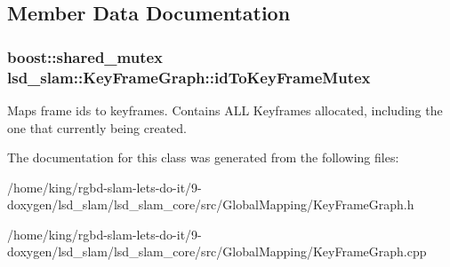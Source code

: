 \subsection{Member Data Documentation}
\hypertarget{classlsd__slam_1_1_key_frame_graph_aec658110a47437fdf2aa9c2fe2a074b4}{
\subsubsection[{id\-To\-Key\-Frame\-Mutex}]{\setlength{\rightskip}{0pt plus 5cm}boost\-::shared\-\_\-mutex lsd\-\_\-slam\-::\-Key\-Frame\-Graph\-::id\-To\-Key\-Frame\-Mutex}}\label{classlsd__slam_1_1_key_frame_graph_aec658110a47437fdf2aa9c2fe2a074b4}
Maps frame ids to keyframes. Contains A\-L\-L Keyframes allocated, including the one that currently being created. 

The documentation for this class was generated from the following files\-:\begin{DoxyCompactItemize}
\item 
/home/king/rgbd-\/slam-\/lets-\/do-\/it/9-\/doxygen/lsd\-\_\-slam/lsd\-\_\-slam\-\_\-core/src/\-Global\-Mapping/Key\-Frame\-Graph.\-h\item 
/home/king/rgbd-\/slam-\/lets-\/do-\/it/9-\/doxygen/lsd\-\_\-slam/lsd\-\_\-slam\-\_\-core/src/\-Global\-Mapping/Key\-Frame\-Graph.\-cpp\end{DoxyCompactItemize}
